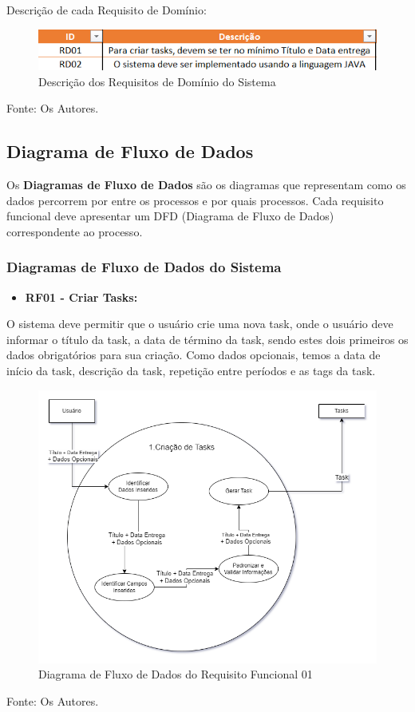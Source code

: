 \documentclass[a4paper,12pt]{article}
\begin{document}
Descrição de cada Requisito de Domínio:
\begin{figure}[H]
	\centering
	\includegraphics[scale=0.80]{requirements/domain/description.png}
	\caption{Descrição dos Requisitos de Domínio do Sistema}
\end{figure}
\noindent Fonte: Os Autores.

\subsection{Diagrama de Fluxo de Dados}
Os \textbf{Diagramas de Fluxo de Dados} são os diagramas que representam como os dados percorrem por entre os processos e por quais processos. 
Cada requisito funcional deve apresentar um DFD (Diagrama de Fluxo de Dados) correspondente ao processo.

\pagebreak
\subsubsection{Diagramas de Fluxo de Dados do Sistema}
\begin{itemize}
\item\textbf{RF01 - Criar Tasks:}
\end{itemize}

O sistema deve permitir que o usuário crie uma nova task, onde o usuário deve informar o título da task, a data 
de término da task, sendo estes dois primeiros os dados obrigatórios para sua criação. Como dados opcionais, temos a 
data de início da task, descrição da task, repetição entre períodos e as tags da task.
\begin{figure}[H]
	\centering
	\includegraphics[scale=0.45]{DFDs/RF01.drawio.png}
	\caption{Diagrama de Fluxo de Dados do Requisito Funcional 01}
\end{figure}
\noindent Fonte: Os Autores.
\end{document}
